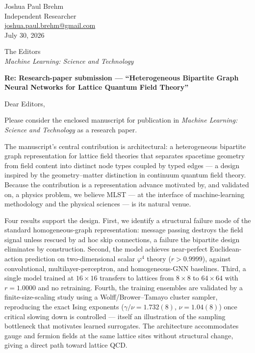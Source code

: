 \documentclass[11pt]{article}
\begin{document}
\begin{flushright}
Joshua Paul Brehm\\
Independent Researcher\\
\href{mailto:joshua.paul.brehm@gmail.com}{joshua.paul.brehm@gmail.com}\\[2ex]
July 30, 2026
\end{flushright}

\noindent The Editors\\
\emph{Machine Learning: Science and Technology}

\vspace{1ex}
\noindent\textbf{Re: Research-paper submission --- ``Heterogeneous Bipartite
Graph Neural Networks for Lattice Quantum Field Theory''}

\vspace{1ex}
Dear Editors,

Please consider the enclosed manuscript for publication in \emph{Machine
Learning: Science and Technology} as a research paper.

The manuscript's central contribution is architectural: a heterogeneous
bipartite graph representation for lattice field theories that separates
spacetime geometry from field content into distinct node types coupled by
typed edges --- a design inspired by the geometry--matter distinction in
continuum quantum field theory. Because the contribution is a representation
advance motivated by, and validated on, a physics problem, we believe MLST
--- at the interface of machine-learning methodology and the physical
sciences --- is its natural venue.

Four results support the design. First, we identify a structural failure
mode of the standard homogeneous-graph representation: message passing
destroys the field signal unless rescued by ad hoc skip connections, a
failure the bipartite design eliminates by construction. Second, the model
achieves near-perfect Euclidean-action prediction on two-dimensional scalar
$\varphi^4$ theory ($r > 0.9999$), against convolutional,
multilayer-perceptron, and homogeneous-GNN baselines. Third, a single model
trained at $16 \times 16$ transfers to lattices from $8 \times 8$ to
$64 \times 64$ with $r = 1.0000$ and no retraining. Fourth, the training
ensembles are validated by a finite-size-scaling study using a
Wolff/Brower--Tamayo cluster sampler, reproducing the exact Ising exponents
($\gamma/\nu = 1.732(8)$, $\nu = 1.04(8)$) once critical slowing down is
controlled --- itself an illustration of the sampling bottleneck that
motivates learned surrogates. The architecture accommodates gauge and
fermion fields at the same lattice sites without structural change, giving
a direct path toward lattice QCD.
\end{document}
